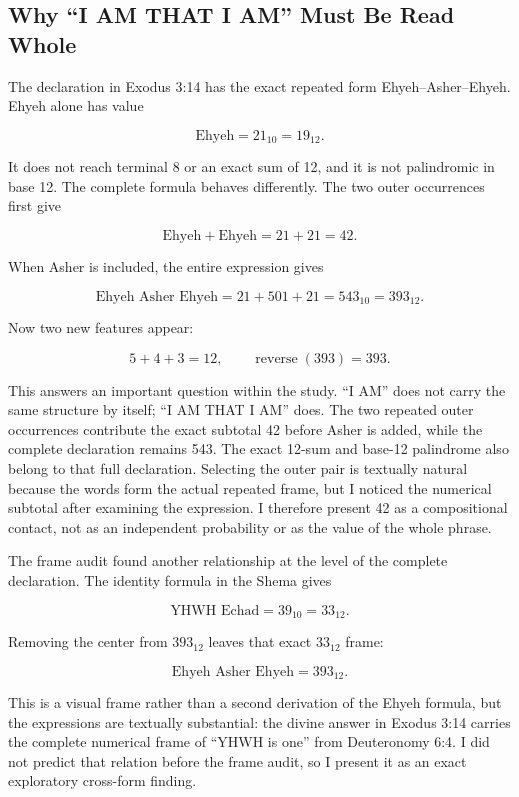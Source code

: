 \subsection{Why ``I AM THAT I AM'' Must Be Read Whole}

The declaration in Exodus 3:14 has the exact repeated form Ehyeh--Asher--Ehyeh.\cite{exodus314} Ehyeh alone has value

\[
\text{Ehyeh}=21_{10}=19_{12}.
\]

It does not reach terminal 8 or an exact sum of 12, and it is not palindromic in base 12. The complete formula behaves differently. The two outer occurrences first give

\[
\text{Ehyeh}+\text{Ehyeh}=21+21=42.
\]

When Asher is included, the entire expression gives

\[
\text{Ehyeh Asher Ehyeh}=21+501+21=543_{10}=393_{12}.
\]

Now two new features appear:

\[
5+4+3=12,
\qquad
\operatorname{reverse}(393)=393.
\]

This answers an important question within the study. ``I AM'' does not carry the same structure by itself; ``I AM THAT I AM'' does. The two repeated outer occurrences contribute the exact subtotal 42 before Asher is added, while the complete declaration remains 543. The exact 12-sum and base-12 palindrome also belong to that full declaration. Selecting the outer pair is textually natural because the words form the actual repeated frame, but I noticed the numerical subtotal after examining the expression. I therefore present 42 as a compositional contact, not as an independent probability or as the value of the whole phrase.

The frame audit found another relationship at the level of the complete declaration. The identity formula in the Shema gives

\[
\text{YHWH Echad}=39_{10}=33_{12}.
\]

Removing the center from $393_{12}$ leaves that exact $33_{12}$ frame:

\[
\text{Ehyeh Asher Ehyeh}=3\boxed{9}3_{12}.
\]

This is a visual frame rather than a second derivation of the Ehyeh formula, but the expressions are textually substantial: the divine answer in Exodus 3:14 carries the complete numerical frame of ``YHWH is one'' from Deuteronomy 6:4. I did not predict that relation before the frame audit, so I present it as an exact exploratory cross-form finding.

